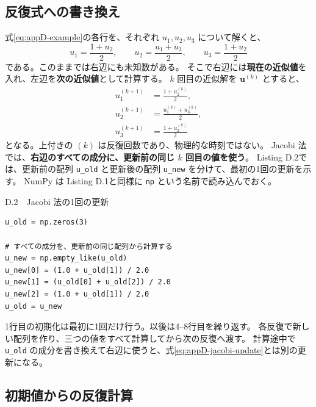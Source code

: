 \subsection{反復式への書き換え}

式\eqref{eq:appD-example}の各行を、それぞれ $u_1,u_2,u_3$ について解くと、
\begin{equation}
 u_1=\frac{1+u_2}{2},\qquad
 u_2=\frac{u_1+u_3}{2},\qquad
 u_3=\frac{1+u_2}{2}
\label{eq:appD-jacobi-rearrange}
\end{equation}
である。このままでは右辺にも未知数がある。
そこで右辺には\textbf{現在の近似値}を入れ、左辺を\textbf{次の近似値}として計算する。
$k$ 回目の近似解を $\boldsymbol u^{(k)}$ とすると、
\begin{equation}
 \boxed{
 \begin{aligned}
 u_1^{(k+1)}&=\frac{1+u_2^{(k)}}{2},\\
 u_2^{(k+1)}&=\frac{u_1^{(k)}+u_3^{(k)}}{2},\\
 u_3^{(k+1)}&=\frac{1+u_2^{(k)}}{2}
 \end{aligned}}
\label{eq:appD-jacobi-update}
\end{equation}
となる。上付きの $(k)$ は反復回数であり、物理的な時刻ではない。
Jacobi 法では、\textbf{右辺のすべての成分に、更新前の同じ $k$ 回目の値を使う}。
Listing D.2では、更新前の配列 \texttt{u\_old} と更新後の配列 \texttt{u\_new} を分けて、最初の1回の更新を示す。
NumPy は Listing D.1と同様に \texttt{np} という名前で読み込んでおく。

\begin{listingbox}[left=6mm]{D.2　Jacobi 法の1回の更新}
\begin{Verbatim}[fontsize=\small]
u_old = np.zeros(3)

# すべての成分を、更新前の同じ配列から計算する
u_new = np.empty_like(u_old)
u_new[0] = (1.0 + u_old[1]) / 2.0
u_new[1] = (u_old[0] + u_old[2]) / 2.0
u_new[2] = (1.0 + u_old[1]) / 2.0
u_old = u_new
\end{Verbatim}
\end{listingbox}

1行目の初期化は最初に1回だけ行う。以後は4--8行目を繰り返す。
各反復で新しい配列を作り、三つの値をすべて計算してから次の反復へ渡す。
計算途中で \texttt{u\_old} の成分を書き換えて右辺に使うと、式\eqref{eq:appD-jacobi-update}とは別の更新になる。

\subsection{初期値からの反復計算}

